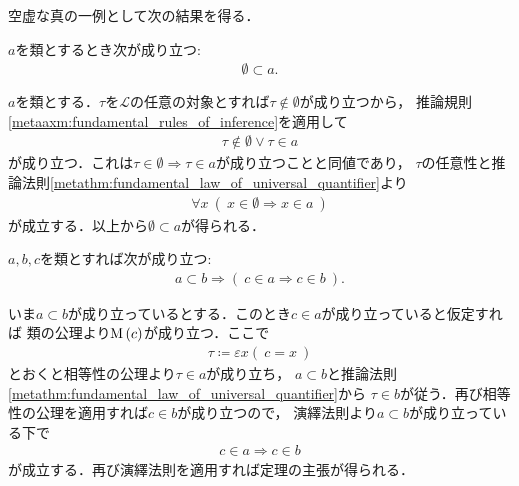 	空虚な真の一例として次の結果を得る．
	
	\begin{screen}
		\begin{thm}[空集合は全ての類に含まれる]
			$a$を類とするとき次が成り立つ:
			\begin{align}
				\emptyset \subset a.
			\end{align}
		\end{thm}
	\end{screen}
	
	\begin{prf}
		$a$を類とする．$\tau$を$\mathcal{L}$の任意の対象とすれば$\tau \notin \emptyset$が成り立つから，
		推論規則\ref{metaaxm:fundamental_rules_of_inference}を適用して
		\begin{align}
			\tau \notin \emptyset \vee \tau \in a
		\end{align}
		が成り立つ．これは$\tau \in \emptyset \Longrightarrow \tau \in a$が成り立つことと同値であり，
		$\tau$の任意性と推論法則\ref{metathm:fundamental_law_of_universal_quantifier}より
		\begin{align}
			\forall x\ (\ x \in \emptyset \Longrightarrow x \in a\ )
		\end{align}
		が成立する．以上から$\emptyset \subset a$が得られる．
		\QED
	\end{prf}
	
	\begin{screen}
		\begin{thm}[類はその部分類に属する全ての類を要素に持つ]\label{thm:subclass_contains_all_elements}
			$a,b,c$を類とすれば次が成り立つ:
			\begin{align}
				a \subset b \Longrightarrow (\ c \in a \Longrightarrow c \in b\ ).
			\end{align}
		\end{thm}
	\end{screen}
	
	\begin{prf}	
		いま$a \subset b$が成り立っているとする．このとき$c \in a$が成り立っていると仮定すれば
		類の公理より$\operatorname*{M}\left(c\right)$が成り立つ．ここで
		\begin{align}
			\tau \coloneqq \varepsilon x(\ c=x\ )
		\end{align}
		とおくと相等性の公理より$\tau \in a$が成り立ち，
		$a \subset b$と推論法則\ref{metathm:fundamental_law_of_universal_quantifier}から
		$\tau \in b$が従う．再び相等性の公理を適用すれば$c \in b$が成り立つので，
		演繹法則より$a \subset b$が成り立っている下で
		\begin{align}
			c \in a \Longrightarrow c \in b
		\end{align}
		が成立する．再び演繹法則を適用すれば定理の主張が得られる．
		\QED
	\end{prf}
	
